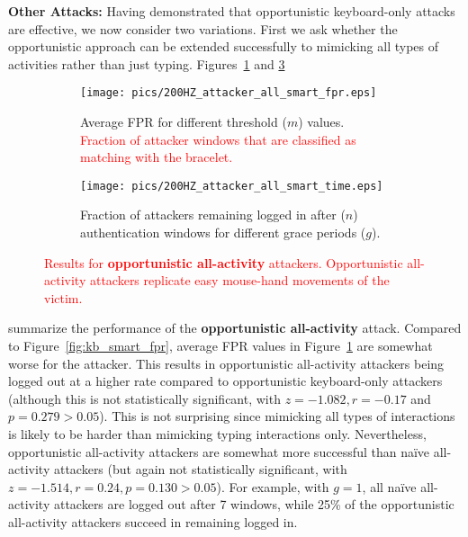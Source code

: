 \documentclass[conference]{IEEEtran}
\newcommand{\KBactivity}{keyboard-only\xspace}
\newcommand{\allactivity}{all-activity\xspace}
\newif\ifllncs
\newcommand\changeMika[1]{\textcolor{red}{#1}}
\newcommand\changeMika[1]{{#1}}
\newcommand{\figwidth}{\columnwidth}
\begin{document}
\vspace{1mm}
\noindent \textbf{Other Attacks:} Having demonstrated that opportunistic \KBactivity attacks are effective, we now consider two variations. First we ask whether the opportunistic approach can be extended successfully to mimicking all types of activities rather than just typing. Figures~\ref{fig:all_smart_fpr} and \ref{fig:all_smart_time}
\ifllncs

\else
\begin{figure}[t!]
	\centering
	\begin{subfigure}[b]{\figwidth}
	\centering
		\texttt{[image: pics/200HZ\_attacker\_all\_smart\_fpr.eps]}
		\caption{Average FPR for different threshold ($m$) values. \changeMika{Fraction of attacker windows that are classified as matching with the bracelet.}}
		\label{fig:all_smart_fpr}
	\end{subfigure}

	\begin{subfigure}[b]{\figwidth}
	\centering
		\texttt{[image: pics/200HZ\_attacker\_all\_smart\_time.eps]}
		\caption{Fraction of attackers remaining logged in
                  after ($n$) authentication windows for different grace periods ($g$).}
		\label{fig:all_smart_time}
	\end{subfigure}
\caption{\changeMika{Results for \textbf{opportunistic \allactivity} attackers. Opportunistic \allactivity attackers replicate easy mouse-hand movements of the victim.}}
\end{figure}
\fi
\ifllncs
(Appendix~\ref{app:extra_attackers})
\fi
summarize the performance of the \textbf{opportunistic \allactivity} attack. Compared to Figure~\ref{fig:kb_smart_fpr}, average FPR values in Figure~\ref{fig:all_smart_fpr} are somewhat worse for the attacker. This results in opportunistic \allactivity attackers being logged out at a higher rate compared to opportunistic \KBactivity 
attackers (although this is not statistically significant, with
$z=-1.082, r=-0.17$ and $p=0.279 > 0.05$). This is not surprising since mimicking all types of interactions is likely to be harder than mimicking typing interactions only. Nevertheless, opportunistic \allactivity attackers are somewhat more successful than na\"ive \allactivity attackers 
(but again not statistically significant, with $z=-1.514, r=0.24, p=0.130 > 0.05$). For example, with $g=1$, all na\"ive \allactivity attackers are logged out after 7 windows, while 25\% of the opportunistic \allactivity attackers succeed in remaining logged in.
\end{document}
